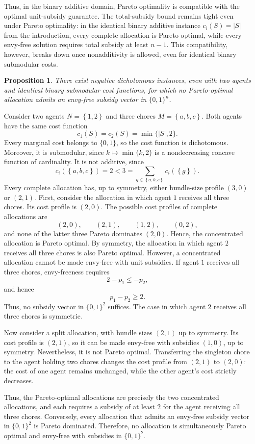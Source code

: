 \documentclass[11pt]{article}
\makeatletter
\theoremstyle{plain}
\newtheorem{proposition}{Proposition}
\theoremstyle{plain}
\renewenvironment{proof}[1][\proofname]{\par
  \pushQED{\qed}%
  \normalfont \topsep6\p@\@plus6\p@\relax
  \trivlist
  \item[\hskip\labelsep\bfseries #1\@addpunct{}]\ignorespaces
}{%
  \popQED\endtrivlist\@endpefalse
}
\newcommand{\agents}{N}                       %
\newcommand{\items}{M}                        %
\newcommand{\cost}{c}
\newcommand{\set}[1]{\left\{#1\right\}}
\newcommand{\abs}[1]{\left\lvert#1\right\rvert}
\makeatother
\begin{document}
Thus, in the binary additive domain, Pareto optimality is compatible with the optimal unit-subsidy guarantee. The total-subsidy bound remains tight even under Pareto optimality: in the identical binary additive instance $c_i(S)=|S|$ from the introduction, every complete allocation is Pareto optimal, while every envy-free solution requires total subsidy at least $n-1$. This compatibility, however, breaks down once nonadditivity is allowed, even for identical binary submodular costs.

\begin{proposition}
\label{prop:po-impossibility}
There exist negative dichotomous instances, even with two agents and identical binary submodular cost functions, for which no Pareto-optimal allocation admits an envy-free subsidy vector in $\{0,1\}^n$.
\end{proposition}

\begin{proof}
Consider two agents $\agents=\set{1,2}$ and three chores $\items=\set{a,b,c}$. Both agents have the same cost function
\[ \cost_1(S)=\cost_2(S)=\min\{\abs S,2\}.
\]
Every marginal cost belongs to $\{0,1\}$, so the cost function is dichotomous. Moreover, it is submodular, since $k\mapsto\min\{k,2\}$ is a nondecreasing concave function of cardinality. It is not additive, since
\[\cost_i(\set{a,b,c})=2<3
    =\sum_{g\in\set{a,b,c}}\cost_i(\set g).
\]
Every complete allocation has, up to symmetry, either bundle-size profile $(3,0)$ or $(2,1)$. First, consider the allocation in which agent $1$ receives all three chores. Its cost profile is $(2,0)$. The possible cost profiles of complete allocations are
\[(2,0),\qquad (2,1),\qquad (1,2),\qquad (0,2),
\]
and none of the latter three Pareto dominates $(2,0)$. Hence, the concentrated allocation is Pareto optimal. By symmetry, the allocation in which agent $2$ receives all three chores is also Pareto optimal. However, a concentrated allocation cannot be made envy-free with unit subsidies. If agent $1$ receives all three chores, envy-freeness requires
\[
    2-p_1\leq -p_2,
\] and hence
\[
    p_1-p_2\geq 2.
\]
Thus, no subsidy vector in $\{0,1\}^2$ suffices. The case in which agent $2$ receives all three chores is symmetric.

Now consider a split allocation, with bundle sizes $(2,1)$ up to symmetry. Its cost profile is $(2,1)$, so it can be made envy-free with subsidies $(1,0)$, up to symmetry. Nevertheless, it is not Pareto optimal. Transferring the singleton chore to the agent holding two chores changes the cost profile from $(2,1)$ to $(2,0)$: the cost of one agent remains unchanged, while the other agent's cost strictly decreases.

Thus, the Pareto-optimal allocations are precisely the two concentrated allocations, and each requires a subsidy of at least $2$ for the agent receiving all three chores. Conversely, every allocation that admits an envy-free subsidy vector in $\{0,1\}^2$ is Pareto dominated. Therefore, no allocation is simultaneously Pareto optimal and envy-free with subsidies in $\{0,1\}^2$.
\end{proof}
\end{document}
